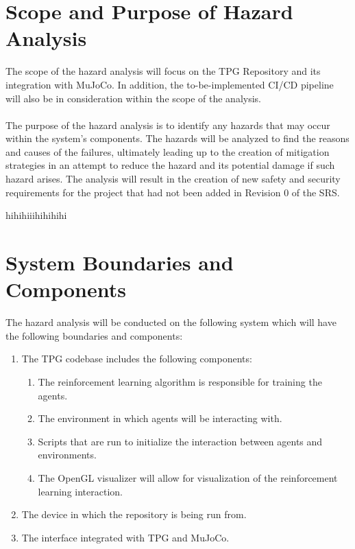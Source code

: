 \documentclass{article}
\begin{document}
\section{Scope and Purpose of Hazard Analysis}


The scope of the hazard analysis will focus on the TPG Repository and its integration with MuJoCo. In addition, the to-be-implemented CI/CD pipeline will also be in consideration within the scope of the analysis. 
\\\\
The purpose of the hazard analysis is to identify any hazards that may occur within the system’s components. The hazards will be analyzed to find the reasons and causes of the failures, ultimately leading up to the creation of mitigation strategies in an attempt to reduce the hazard and its potential damage if such hazard arises. The analysis will result in the creation of new safety and security requirements for the project that had not been added in Revision 0 of the SRS.

hihihiiihihihihi
\section{System Boundaries and Components}


The hazard analysis will be conducted on the following system which will have the following boundaries and components:
\begin{enumerate}
    \item The TPG codebase includes the following components:
    \begin{enumerate}[label=(\alph*)]
        \item The reinforcement learning algorithm is responsible for training the agents.
        \item The environment in which agents will be interacting with.
        \item Scripts that are run to initialize the interaction between agents and environments.
        \item The OpenGL visualizer will allow for visualization of the reinforcement learning interaction. 
    \end{enumerate}
    \item The device in which the repository is being run from.
    \item The interface integrated with TPG and MuJoCo.
\end{enumerate}
\end{document}

